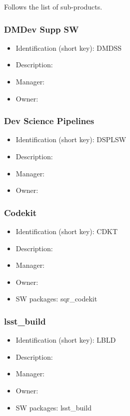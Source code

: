 Follows the list of sub-products.\subsubsection{DMDev Supp SW}\label{sect:DMDSS}
\begin{itemize}
\item Identification (short key): DMDSS
\item Description: 
\item Manager: 
\item Owner: 
\end{itemize}

\subsubsection{Dev Science Pipelines}\label{sect:DSPLSW}
\begin{itemize}
\item Identification (short key): DSPLSW
\item Description: 
\item Manager: 
\item Owner: 
\end{itemize}

\subsubsection{Codekit}\label{sect:CDKT}
\begin{itemize}
\item Identification (short key): CDKT
\item Description: 
\item Manager: 
\item Owner: 
\item SW packages: sqr\_codekit
\end{itemize}

\subsubsection{lsst\_build}\label{sect:LBLD}
\begin{itemize}
\item Identification (short key): LBLD
\item Description: 
\item Manager: 
\item Owner: 
\item SW packages: lsst\_build
\end{itemize}

